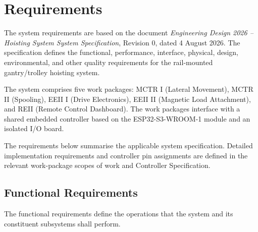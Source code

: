 \section{Requirements}
\label{sec:requirements}

The system requirements are based on the document
\textit{Engineering Design 2026 -- Hoisting System System
Specification}, Revision 0, dated 4 August 2026. The specification
defines the functional, performance, interface, physical, design,
environmental, and other quality requirements for the
rail-mounted gantry/trolley hoisting system.

The system comprises five work packages: MCTR I (Lateral
Movement), MCTR II (Spooling), EEII I (Drive Electronics),
EEII II (Magnetic Load Attachment), and REII (Remote Control
Dashboard). The work packages interface with a shared embedded
controller based on the ESP32-S3-WROOM-1 module and an isolated
I/O board.

The requirements below summarise the applicable system
specification. Detailed implementation requirements and
controller pin assignments are defined in the relevant work-package
scopes of work and Controller Specification.

\subsection{Functional Requirements}
\label{subsec:func-req}

The functional requirements define the operations that the system
and its constituent subsystems shall perform.

